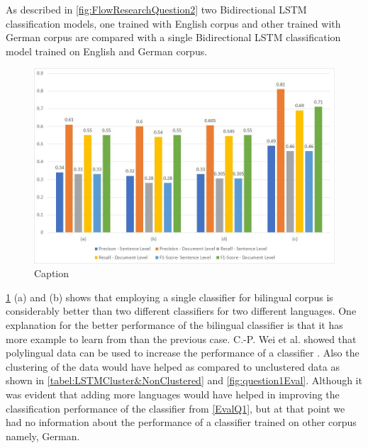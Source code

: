 As described in \ref{fig:FlowResearchQuestion2} two Bidirectional LSTM classification models, one trained with English corpus and other trained with German corpus are compared with a single Bidirectional LSTM classification model trained on English and German corpus.

\begin{figure}[!ht]
    \centering
    \includegraphics[width=15cm, keepaspectratio]{pics/Q3.jpg}
    \caption{Caption}
    \label{fig:EvaluationQuestion3}
\end{figure}

\ref{fig:EvaluationQuestion3} (a) and (b) shows that employing a single classifier for bilingual corpus is considerably better than two different classifiers for two different languages. 
One explanation for the better performance of the bilingual classifier is that it has more example to learn from than the previous case. C.-P. Wei et al. showed that polylingual data can be used to increase the performance of a classifier \cite{Wei:2014:EPD:2566999.2567111}. Also the clustering of the data would have helped as compared to unclustered data as shown in \ref{tabel:LSTMCluster&NonClustered} and  \ref{fig:question1Eval}. Although it was evident that adding more languages would have helped in improving the classification performance of the classifier from \ref{EvalQ1}, but at that point we had no information about the performance of a classifier trained on other corpus namely, German. 
